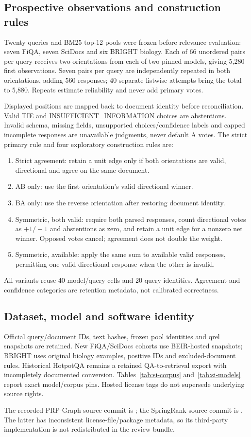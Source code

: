 \documentclass[pdflatex,sn-basic,Numbered]{sn-jnl}
\begin{document}
\subsection{Prospective observations and construction rules}
Twenty queries and BM25 top-12 pools were frozen before relevance evaluation: seven FiQA, seven SciDocs and six BRIGHT biology. Each of 66 unordered pairs per query receives two orientations from each of two pinned models, giving 5,280 first observations. Seven pairs per query are independently repeated in both orientations, adding 560 responses; 40 separate listwise attempts bring the total to 5,880. Repeats estimate reliability and never add primary votes.

Displayed positions are mapped back to document identity before reconciliation. Valid TIE and INSUFFICIENT\_INFORMATION choices are abstentions. Invalid schema, missing fields, unsupported choices/confidence labels and capped incomplete responses are unavailable judgments, never default A votes. The strict primary rule and four exploratory construction rules are:
\begin{enumerate}
\item Strict agreement: retain a unit edge only if both orientations are valid, directional and agree on the same document.
\item AB only: use the first orientation's valid directional winner.
\item BA only: use the reverse orientation after restoring document identity.
\item Symmetric, both valid: require both parsed responses, count directional votes as $+1/-1$ and abstentions as zero, and retain a unit edge for a nonzero net winner. Opposed votes cancel; agreement does not double the weight.
\item Symmetric, available: apply the same sum to available valid responses, permitting one valid directional response when the other is invalid.
\end{enumerate}
All variants reuse 40 model/query cells and 20 query identities. Agreement and confidence categories are retention metadata, not calibrated correctness.

\subsection{Dataset, model and software identity}
Official query/document IDs, text hashes, frozen pool identities and qrel snapshots are retained. New FiQA/SciDocs cohorts use BEIR-hosted snapshots; BRIGHT uses original biology examples, positive IDs and excluded-document rules. Historical HotpotQA remains a retained QA-to-retrieval export with incompletely documented conversion. Tables~\ref{tab:si-corpus} and~\ref{tab:si-models} report exact model/corpus pins. Hosted license tags do not supersede underlying source rights.


The recorded PRP-Graph source commit is \texttt{}; the SpringRank source commit is \texttt{}. The latter has inconsistent license-file/package metadata, so its third-party implementation is not redistributed in the review bundle.
\end{document}
